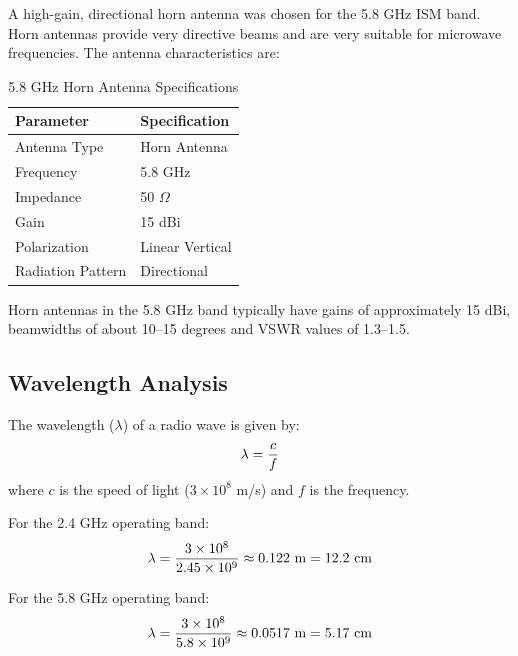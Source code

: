 \documentclass[12pt,a4paper]{report}
\begin{document}
	A high-gain, directional horn antenna was chosen for the 5.8 GHz ISM band. Horn antennas provide very directive beams and are very suitable for microwave frequencies. The antenna characteristics are:
	
	\begin{table}[htbp]
		\centering
		\caption{5.8 GHz Horn Antenna Specifications}
		\label{tab:ant_5.8}
		\begin{tabular}{p{5cm} p{5cm}}
			\toprule
			\textbf{Parameter} & \textbf{Specification} \\
			\midrule
			Antenna Type & Horn Antenna \\
			Frequency & 5.8 GHz \\
			Impedance & 50 $\Omega$ \\
			Gain & 15 dBi \\
			Polarization & Linear Vertical \\
			Radiation Pattern & Directional \\
			\bottomrule
		\end{tabular}
	\end{table}
	
	Horn antennas in the 5.8 GHz band typically have gains of approximately 15 dBi, beamwidths of about 10--15 degrees and VSWR values of 1.3--1.5.
	
	\subsection{Wavelength Analysis}
	The wavelength ($\lambda$) of a radio wave is given by:
	\begingroup
	\setlength{\mathindent}{0pt}
	\begin{equation*}
		\hfill
		\lambda = \frac{c}{f}
		\hfill
	\end{equation*}
	\endgroup
	where $c$ is the speed of light ($3 \times 10^8$ m/s) and $f$ is the frequency.
	
	For the 2.4 GHz operating band:
	\begingroup
	\setlength{\mathindent}{0pt}
	\begin{equation*}
		\hfill
		\lambda = \frac{3 \times 10^8}{2.45 \times 10^9} \approx 0.122\ \text{m} = 12.2\ \text{cm}
		\hfill
	\end{equation*}
	\endgroup
	
	For the 5.8 GHz operating band:
	\begingroup
	\setlength{\mathindent}{0pt}
	\begin{equation*}
		\hfill
		\lambda = \frac{3 \times 10^8}{5.8 \times 10^9} \approx 0.0517\ \text{m} = 5.17\ \text{cm}
		\hfill
	\end{equation*}
	\endgroup
	
\end{document}
